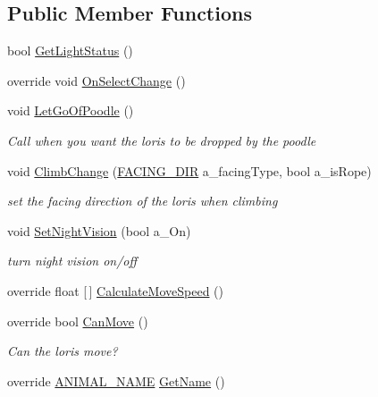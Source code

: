 \subsection*{Public Member Functions}
\begin{DoxyCompactItemize}
\item 
bool \mbox{\hyperlink{class_loris_af59a730da01aa24a64c53e17f1882493}{Get\+Light\+Status}} ()
\item 
override void \mbox{\hyperlink{class_loris_a9da05849af0ab3b5ff8ac6e47f83a8f9}{On\+Select\+Change}} ()
\item 
void \mbox{\hyperlink{class_loris_a502badf5cc594eb1f1f2dd1068c09ecd}{Let\+Go\+Of\+Poodle}} ()
\begin{DoxyCompactList}\small\item\em Call when you want the loris to be dropped by the poodle \end{DoxyCompactList}\item 
void \mbox{\hyperlink{class_loris_aa7b28f6b9624e4a55e63c77a077dc6ad}{Climb\+Change}} (\mbox{\hyperlink{_animal_8cs_a57d10208ebba781ae206546ada2002b6}{F\+A\+C\+I\+N\+G\+\_\+\+D\+IR}} a\+\_\+facing\+Type, bool a\+\_\+is\+Rope)
\begin{DoxyCompactList}\small\item\em set the facing direction of the loris when climbing \end{DoxyCompactList}\item 
void \mbox{\hyperlink{class_loris_a07f351bb7f66abc3ac7dd879997bd510}{Set\+Night\+Vision}} (bool a\+\_\+\+On)
\begin{DoxyCompactList}\small\item\em turn night vision on/off \end{DoxyCompactList}\item 
override float \mbox{[}$\,$\mbox{]} \mbox{\hyperlink{class_loris_a5356c9fe0717f3c6fe10be650cbe3c48}{Calculate\+Move\+Speed}} ()
\item 
override bool \mbox{\hyperlink{class_loris_a58dcb13392476fa95e7f9f26c5f46ce6}{Can\+Move}} ()
\begin{DoxyCompactList}\small\item\em Can the loris move? \end{DoxyCompactList}\item 
override \mbox{\hyperlink{_animal_8cs_a2fa5713399b84d1b88dae9196837af50}{A\+N\+I\+M\+A\+L\+\_\+\+N\+A\+ME}} \mbox{\hyperlink{class_loris_afb060974c2d879a9700544f12d0bc819}{Get\+Name}} ()
\end{DoxyCompactItemize}
